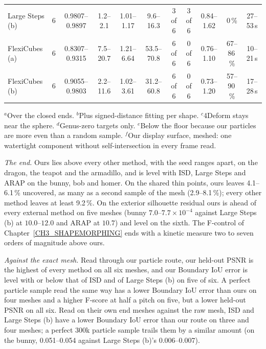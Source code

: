 \begin{table}[t]
{\begin{tabular}{lcccccccccc}
Large Steps (b) & 6 & 0.9807--0.9897 & 1.2--2.1 & 1.01--1.17 & 9.6--16.3 & 3 of 6 & 3 of 6 & 0.84--1.62 & 0\,\% & 27--53\,s \\
FlexiCubes (a) & 6 & 0.8307--0.9315 & 7.5--20.7 & 1.21--6.64 & 53.5--70.8 & 6 of 6 & 0 of 6 & 0.76--1.10 & 67--86\,\% & 10--21\,s \\
FlexiCubes (b) & 6 & 0.9055--0.9803 & 2.2--11.6 & 1.02--3.61 & 31.2--60.8 & 6 of 6 & 0 of 6 & 0.73--1.20 & 57--90\,\% & 17--28\,s \\
\bottomrule
\end{tabular}}
\par\smallskip
\begin{minipage}{\textwidth}\scriptsize
$^a$Over the closed ends. $^b$Plus signed-distance fitting per shape. $^c$4Deform stays near the sphere.
$^d$Genus-zero targets only. $^e$Below the floor because our particles are more even than a random sample.
$^f$Our display surface, meshed: one watertight component without self-intersection in every frame read.
\end{minipage}
\end{table}

\textit{The end.} Ours lies above every other method, with the seed ranges apart, on the dragon, the teapot and the armadillo,
and is level with ISD, Large Steps and ARAP on the bunny, bob and homer. On the shared thin points, ours leaves 4.1--6.1\,\%
uncovered, as many as a second sample of the mesh (2.9--8.1\,\%); every other method leaves at least 9.2\,\%. On the exterior
silhouette residual ours is ahead of every external method on five meshes (bunny $7.0$--$7.7\times10^{-4}$ against Large Steps
(b) at $10.0$--$12.0$ and ARAP at $10.7$) and level on the sixth. The F-control of Chapter~\ref{CH3_SHAPEMORPHING} ends with a
kinetic measure two to seven orders of magnitude above ours.

\textit{Against the exact mesh.} Read through our particle route, our held-out PSNR is the highest of every method on all six
meshes, and our Boundary IoU error is level with or below that of ISD and of Large Steps (b) on five of six. A perfect particle
sample read the same way has a lower Boundary IoU error than ours on four meshes and a higher F-score at half a pitch on five, but
a lower held-out PSNR on all six. Read on their own end meshes against the raw mesh, ISD and Large Steps (b) have a lower Boundary
IoU error than our route on three and four meshes; a perfect 300k particle sample trails them by a similar amount (on the bunny,
0.051--0.054 against Large Steps (b)'s 0.006--0.007).

